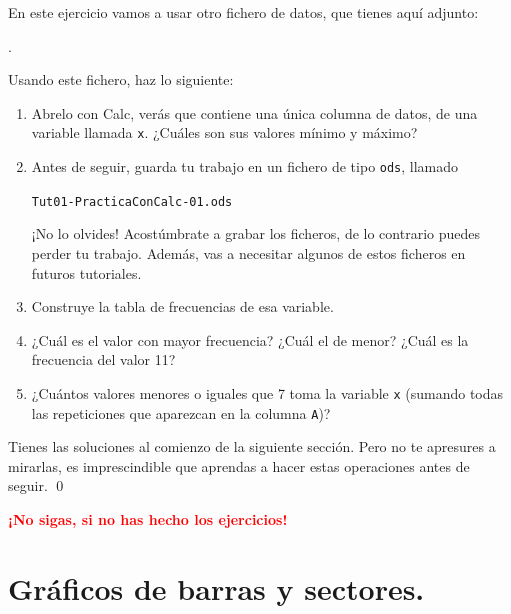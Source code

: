 \documentclass[10pt,a4paper]{article}\usepackage[]{graphicx}\usepackage[]{color}
\newcounter {cont01}
\begin{document}
\begin{ejercicio}
\label{tut01:ejercicio02}
\label{tut01:fichero:Tut01-PracticaConCalc-01}
En este ejercicio vamos a usar otro fichero de datos, que tienes aquí adjunto:
\begin{center}
.
\end{center}
%

Usando este fichero, haz lo siguiente:
\begin{enumerate}
  \item Abrelo con Calc, verás que contiene una única columna de datos, de una variable llamada {\tt x}. ¿Cuáles son sus valores mínimo y máximo?
  \item Antes de seguir, guarda tu trabajo en un fichero de tipo {\tt ods}, llamado
    \begin{center}
      {\tt Tut01-PracticaConCalc-01.ods}
    \end{center}
    ¡No lo olvides! Acostúmbrate a grabar los ficheros, de lo contrario puedes perder tu trabajo.  Además, vas a necesitar algunos de estos ficheros en futuros tutoriales.
  \item Construye la tabla de frecuencias de esa variable.
  \item ¿Cuál es el valor con mayor frecuencia? ¿Cuál el de menor? ¿Cuál es la frecuencia del valor 11?
  \item ¿Cuántos valores menores o iguales que 7 toma la variable {\tt x} (sumando todas las repeticiones que aparezcan en la columna {\tt A})?

\end{enumerate}
Tienes las soluciones al comienzo de la siguiente sección. Pero no te apresures a mirarlas, es imprescindible que aprendas a hacer estas operaciones antes de seguir.
\qed
\end{ejercicio}

\vspace{8cm}

\begin{center}
  \textcolor{red}{\LARGE\bf ¡No sigas, si no has hecho los ejercicios!}
\end{center}

\newpage
\section{Gráficos de barras y sectores.}
\end{document}

